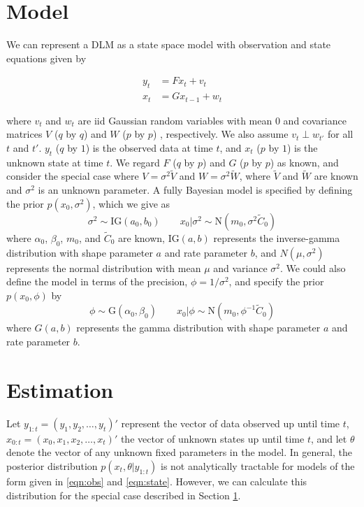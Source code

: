 \documentclass{article}
\begin{document}
\section{Model} \label{sec:model}

We can represent a DLM as a state space model with observation and state equations given by

\begin{align}
y_t &= Fx_t + v_t \label{eqn:obs} \\
x_t &= Gx_{t-1} + w_t \label{eqn:state}
\end{align}

\noindent where $v_t$ and $w_t$ are iid Gaussian random variables with mean 0 and covariance matrices $V$ ($q$ by $q$) and $W$ ($p$ by $p$) , respectively. We also assume $v_t \perp w_{t'}$ for all $t$ and $t'$. $y_t$ ($q$ by $1$) is the observed data at time $t$, and $x_t$ ($p$ by $1$)  is the unknown state at time $t$. We regard $F$ ($q$ by $p$) and $G$ ($p$ by $p$) as known, and consider the special case where $V = \sigma^2\tilde{V}$ and $W = \sigma^2\tilde{W}$, where $\tilde{V}$ and $\tilde{W}$ are known and $\sigma^2$ is an unknown parameter. A fully Bayesian model is specified by defining the prior $p(x_0,\sigma^2)$, which we give as \[\sigma^2 \sim \mbox{IG}(a_0,b_0) \qquad x_0|\sigma^2 \sim \mbox{N}(m_0,\sigma^2\tilde{C}_0)\]
\noindent where $\alpha_0$, $\beta_0$, $m_0$, and $\tilde{C}_0$ are known, $\mbox{IG}(a,b)$ represents the inverse-gamma distribution with shape parameter $a$ and rate parameter $b$, and $N(\mu,\sigma^2)$ represents the normal distribution with mean $\mu$ and variance $\sigma^2$. We could also define the model in terms of the precision, $\phi = 1 / \sigma^2$, and specify the prior $p(x_0,\phi)$ by \[\phi \sim \mbox{G}(\alpha_0,\beta_0) \qquad x_0|\phi \sim \mbox{N}(m_0,\phi^{-1}\tilde{C}_0)\]
\noindent where $G(a,b)$ represents the gamma distribution with shape parameter $a$ and rate parameter $b$.

\section{Estimation} \label{sec:estimation}

Let $y_{1:t} = (y_1,y_2,\ldots,y_t)'$ represent the vector of data observed up until time $t$, $x_{0:t} = (x_0,x_1,x_2,\ldots,x_t)'$ the vector of unknown states up until time $t$, and let $\theta$ denote the vector of any unknown fixed parameters in the model. In general, the posterior distribution $p(x_t,\theta|y_{1:t})$ is not analytically tractable for models of the form given in \eqref{eqn:obs} and \eqref{eqn:state}. However, we can calculate this distribution for the special case described in Section \ref{sec:model}.
\end{document}
